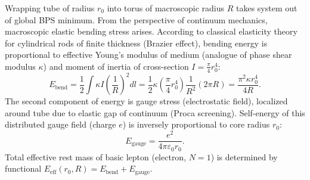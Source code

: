 \documentclass[12pt,a4paper]{article}
\begin{document}
Wrapping tube of radius $r_0$ into torus of macroscopic radius $R$ takes system out of global BPS minimum. From the perspective of continuum mechanics, macroscopic elastic bending stress arises. According to classical elasticity theory for cylindrical rods of finite thickness (Brazier effect), bending energy is proportional to effective Young's modulus of medium (analogue of phase shear modulus $\kappa$) and moment of inertia of cross-section $I = \frac{\pi}{4}r_0^4$:
\begin{equation}
    E_{\text{bend}} = \frac{1}{2} \int \kappa I \left(\frac{1}{R}\right)^2 dl = \frac{1}{2} \kappa \left( \frac{\pi}{4}r_0^4 \right) \frac{1}{R^2} (2\pi R) = \frac{\pi^2 \kappa r_0^4}{4R}.
    \label{eq:bending_elastic}
\end{equation}
The second component of energy is gauge stress (electrostatic field), localized around tube due to elastic gap of continuum (Proca screening). Self-energy of this distributed gauge field (charge $e$) is inversely proportional to core radius $r_0$:
\begin{equation}
    E_{\text{gauge}} = \frac{e^2}{4\pi\varepsilon_0 r_0}.
    \label{eq:gauge_energy}
\end{equation}
Total effective rest mass of basic lepton (electron, $N=1$) is determined by functional $E_{\text{eff}}(r_0,R) = E_{\text{bend}} + E_{\text{gauge}}$.
\end{document}
